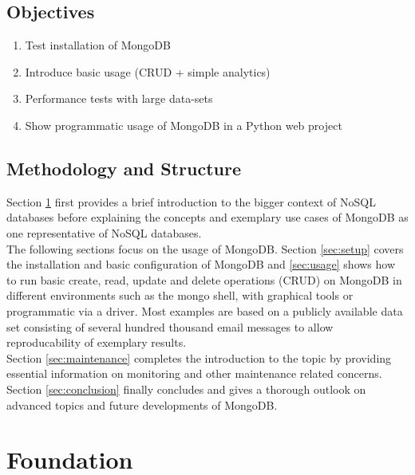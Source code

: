 \subsection{Objectives}
\label{sec:objectives}

\begin{enumerate}
  \item Test installation of MongoDB
  \item Introduce basic usage (CRUD + simple analytics)
  \item Performance tests with large data-sets
  \item Show programmatic usage of MongoDB in a Python web project
\end{enumerate}

\subsection{Methodology and Structure}
\label{sec:methodology}

Section \ref{sec:foundation} first provides a brief introduction to the bigger
context of NoSQL databases before explaining the concepts and exemplary use
cases of MongoDB as one representative of NoSQL databases.\\
The following sections focus on the usage of MongoDB. Section \ref{sec:setup}
covers the installation and basic configuration of MongoDB and
\autoref{sec:usage} shows how to run basic create, read, update and delete
operations (CRUD) on MongoDB in different environments such as the mongo shell,
with graphical tools or programmatic via a driver.
Most examples are based on a publicly available data set consisting of several
hundred thousand email messages to allow reproducability of exemplary
results.\\
Section \ref{sec:maintenance} completes the introduction to the topic by
providing essential information on monitoring and other maintenance related
concerns. Section \ref{sec:conclusion} finally concludes and gives a thorough
outlook on advanced topics and future developments of MongoDB.


\newpage

\section{Foundation}
\label{sec:foundation}



